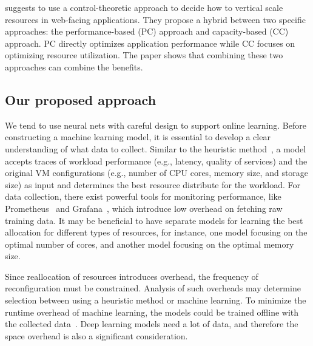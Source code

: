 \cite{farokhi2016hybrid} suggests to use a control-theoretic approach to decide
how to vertical scale resources in web-facing applications.  They propose a
hybrid between two specific approaches: the performance-based (PC) approach and
capacity-based (CC) approach.  PC directly optimizes application performance
while CC focuses on optimizing resource utilization.  The paper shows that
combining these two approaches can combine the benefits.

\subsection{Our proposed approach} We tend to use neural nets with careful
design to support online learning. Before constructing a machine learning model,
it is essential to develop a clear understanding of what data to collect.
Similar to the heuristic method~\cite{sedaghat2013virtual}, a model accepts
traces of workload performance (e.g., latency, quality of services) and the
original VM configurations (e.g., number of CPU cores, memory size, and storage
size) as input and determines the best resource distribute for the workload.
For data collection, there exist powerful tools for monitoring performance, like
Prometheus~\cite{sukhija2019towards} and Grafana~\cite{Grafana}, which introduce
low overhead on fetching raw training data.  It may be beneficial to have
separate models for learning the best allocation for different types of
resources, for instance, one model focusing on the optimal number of cores, and
another model focusing on the optimal memory size.

Since reallocation of resources introduces overhead, the frequency of
reconfiguration must be constrained.  Analysis of such overheads may determine
selection between using a heuristic method or machine learning.  To minimize the
runtime overhead of machine learning, the models could be trained offline with
the collected data~\cite{zhang2019learned}. Deep learning models need a lot of
data, and therefore the space overhead is also a significant consideration.
